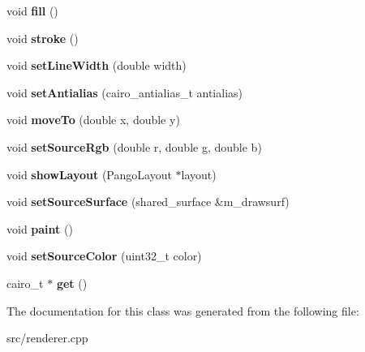 \begin{DoxyCompactItemize}
\item 
\mbox{\label{classrenderer_1_1Context_a7722e3dff5760f02c0b4332e12a36391}} 
void {\bfseries fill} ()
\item 
\mbox{\label{classrenderer_1_1Context_ad40cf83090ee9e8748fa271fe3c8e07d}} 
void {\bfseries stroke} ()
\item 
\mbox{\label{classrenderer_1_1Context_a99e424d9906463b37e0b694223179220}} 
void {\bfseries set\+Line\+Width} (double width)
\item 
\mbox{\label{classrenderer_1_1Context_a6d333fe3e7861a12a11e141d30fe14bc}} 
void {\bfseries set\+Antialias} (cairo\+\_\+antialias\+\_\+t antialias)
\item 
\mbox{\label{classrenderer_1_1Context_a6006a549f663d8b56b11227696e8191e}} 
void {\bfseries move\+To} (double x, double y)
\item 
\mbox{\label{classrenderer_1_1Context_abd117f9b9f7db298b6c68e5eb2ef3a36}} 
void {\bfseries set\+Source\+Rgb} (double r, double g, double b)
\item 
\mbox{\label{classrenderer_1_1Context_ae256d437432bfc753e28776eb89d5877}} 
void {\bfseries show\+Layout} (Pango\+Layout $\ast$layout)
\item 
\mbox{\label{classrenderer_1_1Context_a3cd8aff58c3aeae48ceaf56feee2c5bf}} 
void {\bfseries set\+Source\+Surface} (shared\+\_\+surface \&m\+\_\+drawsurf)
\item 
\mbox{\label{classrenderer_1_1Context_ae34c9dd67607f55b79eaf8c11b249138}} 
void {\bfseries paint} ()
\item 
\mbox{\label{classrenderer_1_1Context_a6e8155ff92578c2225488765e9d94532}} 
void {\bfseries set\+Source\+Color} (uint32\+\_\+t color)
\item 
\mbox{\label{classrenderer_1_1Context_a8c07c49d77198e219fe1653bcc9f263d}} 
cairo\+\_\+t $\ast$ {\bfseries get} ()
\end{DoxyCompactItemize}


The documentation for this class was generated from the following file\+:\begin{DoxyCompactItemize}
\item 
src/renderer.\+cpp\end{DoxyCompactItemize}
